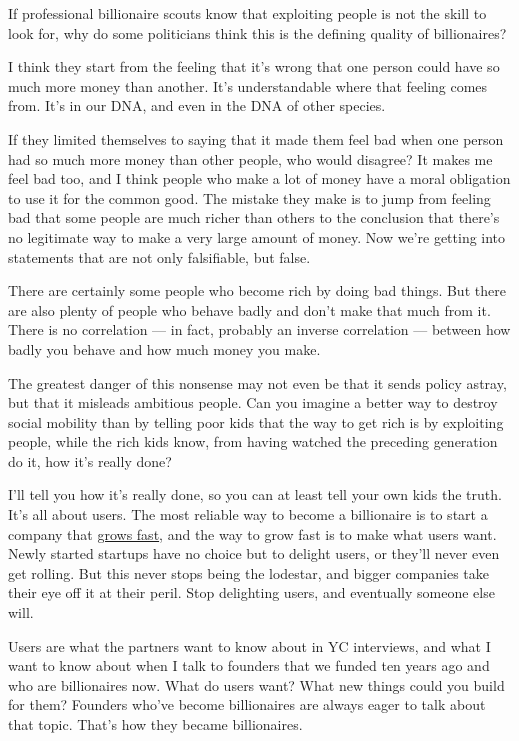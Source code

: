 If professional billionaire scouts know that exploiting people is not
the skill to look for, why do some politicians think this is the
defining quality of billionaires?

I think they start from the feeling that it's wrong that one person
could have so much more money than another. It's understandable where
that feeling comes from. It's in our DNA, and even in the DNA of other
species.

If they limited themselves to saying that it made them feel bad when one
person had so much more money than other people, who would disagree? It
makes me feel bad too, and I think people who make a lot of money have a
moral obligation to use it for the common good. The mistake they make is
to jump from feeling bad that some people are much richer than others to
the conclusion that there's no legitimate way to make a very large
amount of money. Now we're getting into statements that are not only
falsifiable, but false.

There are certainly some people who become rich by doing bad things. But
there are also plenty of people who behave badly and don't make that
much from it. There is no correlation --- in fact, probably an inverse
correlation --- between how badly you behave and how much money you
make.

The greatest danger of this nonsense may not even be that it sends
policy astray, but that it misleads ambitious people. Can you imagine a
better way to destroy social mobility than by telling poor kids that the
way to get rich is by exploiting people, while the rich kids know, from
having watched the preceding generation do it, how it's really done?

I'll tell you how it's really done, so you can at least tell your own
kids the truth. It's all about users. The most reliable way to become a
billionaire is to start a company that \href{growth.html}{grows fast},
and the way to grow fast is to make what users want. Newly started
startups have no choice but to delight users, or they'll never even get
rolling. But this never stops being the lodestar, and bigger companies
take their eye off it at their peril. Stop delighting users, and
eventually someone else will.

Users are what the partners want to know about in YC interviews, and
what I want to know about when I talk to founders that we funded ten
years ago and who are billionaires now. What do users want? What new
things could you build for them? Founders who've become billionaires are
always eager to talk about that topic. That's how they became
billionaires.

